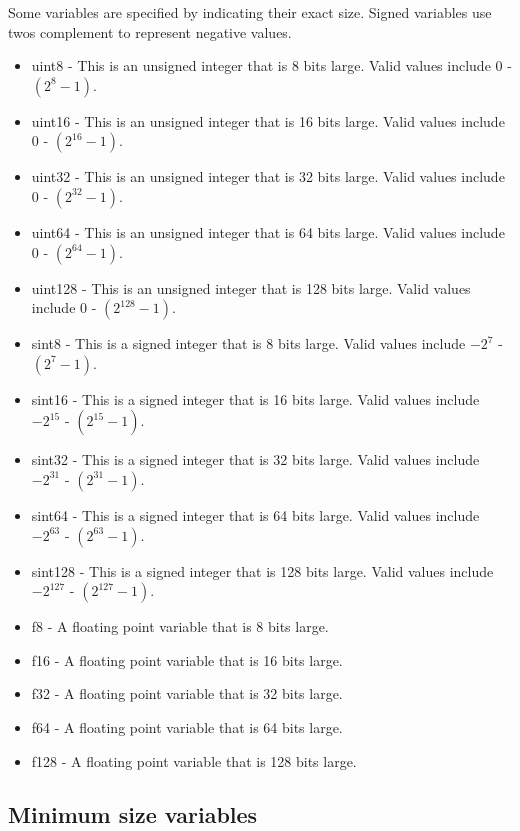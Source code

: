 \documentclass[12pt]{article}
\begin{document}
Some variables are specified by indicating their exact size. Signed variables use twos complement to represent negative values.
\begin{itemize}
\item uint8 - This is an unsigned integer that is 8 bits large. Valid values include 0 - $(2^8 - 1)$.
\item uint16 - This is an unsigned integer that is 16 bits large. Valid values include 0 - $(2^{16} - 1)$.
\item uint32 - This is an unsigned integer that is 32 bits large. Valid values include 0 - $(2^{32} - 1)$.
\item uint64 - This is an unsigned integer that is 64 bits large. Valid values include 0 - $(2^{64} - 1)$.
\item uint128 - This is an unsigned integer that is 128 bits large. Valid values include 0 - $(2^{128} - 1)$.

\item sint8 - This is a signed integer that is 8 bits large. Valid values include $-2^7$ - $(2^7 - 1)$.
\item sint16 - This is a signed integer that is 16 bits large. Valid values include $-2^{15}$ - $(2^{15} - 1)$.
\item sint32 - This is a signed integer that is 32 bits large. Valid values include $-2^{31}$ - $(2^{31} - 1)$.
\item sint64 - This is a signed integer that is 64 bits large. Valid values include $-2^{63}$ - $(2^{63} - 1)$.
\item sint128 - This is a signed integer that is 128 bits large. Valid values include $-2^{127}$ - $(2^{127} - 1)$.

\item f8 - A floating point variable that is 8 bits large.
\item f16 - A floating point variable that is 16 bits large.
\item f32 - A floating point variable that is 32 bits large.
\item f64 - A floating point variable that is 64 bits large.
\item f128 - A floating point variable that is 128 bits large.

\end{itemize}

\subsection{Minimum size variables}
\end{document}
